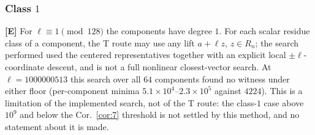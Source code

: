 \documentclass[11pt]{amsart}
\theoremstyle{remark}\newtheorem{remark}[theorem]{Remark}
\theoremstyle{definition}\newtheorem{definition}[theorem]{Definition}
\theoremstyle{definition}\newtheorem{algorithm}[theorem]{Algorithm}
\newcommand{\lbl}[1]{\textbf{[#1]}}\newcommand{\barT}{\bar T_n}
\begin{document}
\subsubsection{Class $1$} \lbl{E} For $\ell\equiv1\pmod{128}$ the components have degree $1$. For each scalar residue class of a component, the T route may use any lift $a+\ell z$, $z\in R_n$; the search performed used the centered representatives together with an explicit local $\pm\ell$-coordinate descent, and is not a full nonlinear closest-vector search. At $\ell=1000000513$ this search over all $64$ components found no witness under either floor (per-component minima $5.1\times10^4$--$2.3\times10^5$ against $4224$). This is a limitation of the implemented search, not of the T route: the class-$1$ case above $10^9$ and below the Cor.~\ref{cor:7} threshold is not settled by this method, and no statement about it is made.
\end{document}
